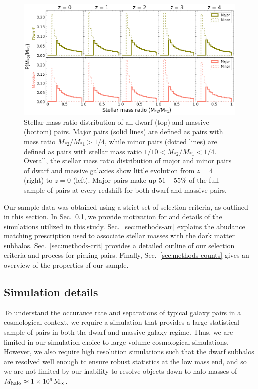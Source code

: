 \documentclass[twocolumn]{aastex631}
\newcommand{\ms}[1]{\ensuremath{M_{*{#1}}}}
\begin{document}
  \begin{figure}[htp]
    \centering
    \includegraphics[width=\textwidth]{smrdist_1000.png}
    \caption{Stellar mass ratio distribution of all dwarf (top) and massive (bottom) pairs. Major pairs (solid lines) are defined as pairs with mass ratio $\ms{2}/\ms{1} > 1/4$, while minor pairs (dotted lines) are defined as pairs with stellar mass ratio $1/10<\ms{2}/\ms{1}<1/4$. Overall, the stellar mass ratio distribution of major and minor pairs of dwarf and massive galaxies show little evolution from $z=4$ (right) to $z=0$ (left). 
    Major pairs make up $51-55\%$ of the full sample of pairs at every redshift for both dwarf and massive pairs.}
    \label{fig:massratio}
  \end{figure}


Our sample data was obtained using a strict set of selection criteria, as outlined in this section.
In Sec.~\ref{sec:methods-sims}, we provide motivation for and details of the simulations utilized in this study.
Sec.~\ref{sec:methods-am} explains the abudance matching prescription used to associate stellar masses with the dark matter subhalos.
Sec.~\ref{sec:methods-crit} provides a detailed outline of our selection criteria and process for picking pairs.
Finally, Sec.~\ref{sec:methods-counts} gives an overview of the properties of our sample.

\subsection{Simulation details}\label{sec:methods-sims}
To understand the occurance rate and separations of typical galaxy pairs in a cosmological context, we require a simulation that provides a large statistical sample of pairs in both the dwarf and massive galaxy regime. 
Thus, we are limited in our simulation choice to large-volume cosmological simulations. 
However, we also require high resolution simulations such that the dwarf subhalos are resolved well enough to ensure robust statistics at the low mass end, and so we are not limited by our inability to resolve objects down to halo masses of $M_{\rm halo}\approx1\times 10^9\, \mathrm{M}_\odot$.
\end{document}
